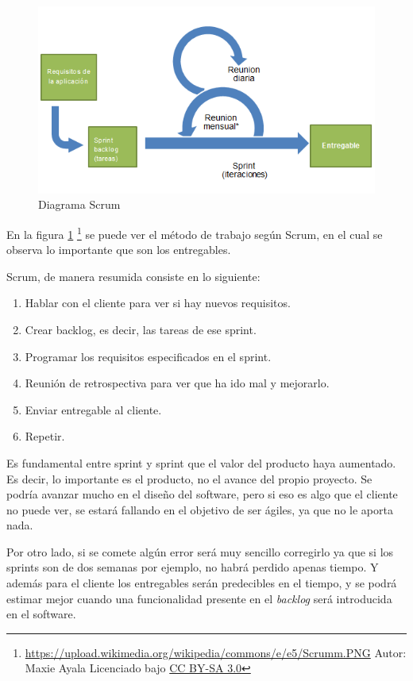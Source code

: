 \begin{figure}[H]
    \includegraphics[width=0.7\linewidth]{./Figures/Scrumm.PNG}
    \caption[Proceso iterativo Scrum]{Diagrama Scrum}
    \label{fig:Scrum}
\end{figure}

En la figura \ref{fig:Scrum} \footnote{\url{https://upload.wikimedia.org/wikipedia/commons/e/e5/Scrumm.PNG} Autor: Maxie Ayala 
	Licenciado bajo \hyperlink{creativecommons.org/licenses/by-sa/3.0/}{CC BY-SA 3.0}} 
se puede ver el método de trabajo seg\'un Scrum, en el cual se observa lo importante que son los entregables.

Scrum, de manera resumida consiste en lo siguiente:
\begin{enumerate}
    \item Hablar con el cliente para ver si hay nuevos requisitos.
    \item Crear backlog, es decir, las tareas de ese sprint.
    \item Programar los requisitos especificados en el sprint.
    \item Reunión de retrospectiva para ver que ha ido mal y mejorarlo.
    \item Enviar entregable al cliente.
    \item Repetir.
\end{enumerate}

Es fundamental entre sprint y sprint que el valor del producto haya aumentado. Es decir, lo importante es el producto, no el avance del propio proyecto. Se podr\'ia avanzar mucho en el dise\~no del software, pero si eso es algo que el cliente no 
puede ver, se estar\'a fallando en el objetivo de ser \'agiles, ya que no le aporta nada.

Por otro lado, si se comete alg\'un error ser\'a muy sencillo corregirlo ya que si los sprints son de dos semanas por ejemplo, no 
habr\'a perdido apenas tiempo. Y adem\'as para el cliente los entregables ser\'an predecibles en el tiempo, y se podr\'a estimar mejor cuando una funcionalidad presente en el \emph{backlog}
ser\'a introducida en el software.

